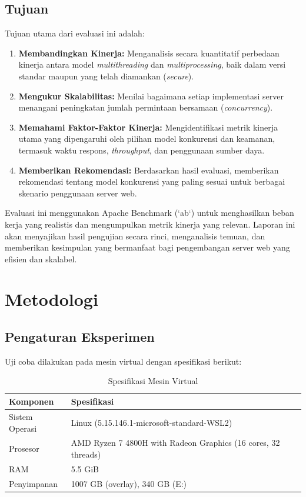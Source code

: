 \documentclass[12pt]{article}
\begin{document}
\subsection{Tujuan}

Tujuan utama dari evaluasi ini adalah:

\begin{enumerate}
    \item \textbf{Membandingkan Kinerja:} Menganalisis secara kuantitatif perbedaan kinerja antara model \textit{multithreading} dan \textit{multiprocessing}, baik dalam versi standar maupun yang telah diamankan (\textit{secure}).
    \item \textbf{Mengukur Skalabilitas:} Menilai bagaimana setiap implementasi server menangani peningkatan jumlah permintaan bersamaan (\textit{concurrency}).
    \item \textbf{Memahami Faktor-Faktor Kinerja:} Mengidentifikasi metrik kinerja utama yang dipengaruhi oleh pilihan model konkurensi dan keamanan, termasuk waktu respons, \textit{throughput}, dan penggunaan sumber daya.
    \item \textbf{Memberikan Rekomendasi:} Berdasarkan hasil evaluasi, memberikan rekomendasi tentang model konkurensi yang paling sesuai untuk berbagai skenario penggunaan server web.
\end{enumerate}

Evaluasi ini menggunakan Apache Benchmark (`ab`) untuk menghasilkan beban kerja yang realistis dan mengumpulkan metrik kinerja yang relevan. Laporan ini akan menyajikan hasil pengujian secara rinci, menganalisis temuan, dan memberikan kesimpulan yang bermanfaat bagi pengembangan server web yang efisien dan skalabel.
\newpage

\section{Metodologi}
\subsection{Pengaturan Eksperimen}
Uji coba dilakukan pada mesin virtual dengan spesifikasi berikut:

\begin{table}[h]
\centering
\caption{Spesifikasi Mesin Virtual}
\label{tab:vm_specs}
\begin{tabular}{|l|l|}
\hline
\textbf{Komponen} & \textbf{Spesifikasi} \\ \hline
Sistem Operasi & Linux (5.15.146.1-microsoft-standard-WSL2) \\ 
Prosesor & AMD Ryzen 7 4800H with Radeon Graphics (16 cores, 32 threads) \\
RAM & 5.5 GiB \\
Penyimpanan & 1007 GB (overlay), 340 GB (E:) \\
\hline
\end{tabular}
\end{table}
\end{document}
